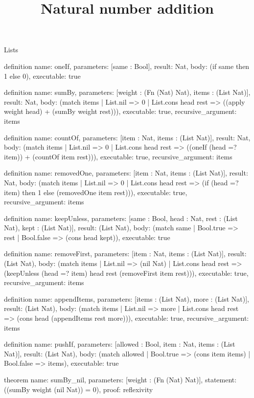 \begin{lexlean}{Lists}
\title{Natural number addition}
\begin{semanticmodule}
definition{
  name: oneIf,
  parameters: [same : Bool],
  result: Nat,
  body: (if same then 1 else 0),
  executable: true
}

definition{
  name: sumBy,
  parameters: [weight : (Fn (Nat) Nat), items : (List Nat)],
  result: Nat,
  body: (match items
    | List.nil => 0
    | List.cons head rest => ((apply weight head) + (sumBy weight rest))),
  executable: true,
  recursive_argument: items
}

definition{
  name: countOf,
  parameters: [item : Nat, items : (List Nat)],
  result: Nat,
  body: (match items
    | List.nil => 0
    | List.cons head rest => ((oneIf (head =? item)) + (countOf item rest))),
  executable: true,
  recursive_argument: items
}

definition{
  name: removedOne,
  parameters: [item : Nat, items : (List Nat)],
  result: Nat,
  body: (match items
    | List.nil => 0
    | List.cons head rest => (if (head =? item) then 1 else (removedOne item rest))),
  executable: true,
  recursive_argument: items
}

definition{
  name: keepUnless,
  parameters: [same : Bool, head : Nat, rest : (List Nat), kept : (List Nat)],
  result: (List Nat),
  body: (match same | Bool.true => rest | Bool.false => (cons head kept)),
  executable: true
}

definition{
  name: removeFirst,
  parameters: [item : Nat, items : (List Nat)],
  result: (List Nat),
  body: (match items
    | List.nil => (nil Nat)
    | List.cons head rest => (keepUnless (head =? item) head rest (removeFirst item rest))),
  executable: true,
  recursive_argument: items
}

definition{
  name: appendItems,
  parameters: [items : (List Nat), more : (List Nat)],
  result: (List Nat),
  body: (match items
    | List.nil => more
    | List.cons head rest => (cons head (appendItems rest more))),
  executable: true,
  recursive_argument: items
}

definition{
  name: pushIf,
  parameters: [allowed : Bool, item : Nat, items : (List Nat)],
  result: (List Nat),
  body: (match allowed | Bool.true => (cons item items) | Bool.false => items),
  executable: true
}

theorem{
  name: sumBy_nil,
  parameters: [weight : (Fn (Nat) Nat)],
  statement: ((sumBy weight (nil Nat)) = 0),
  proof: reflexivity{}
}


\end{semanticmodule}
\end{lexlean}

